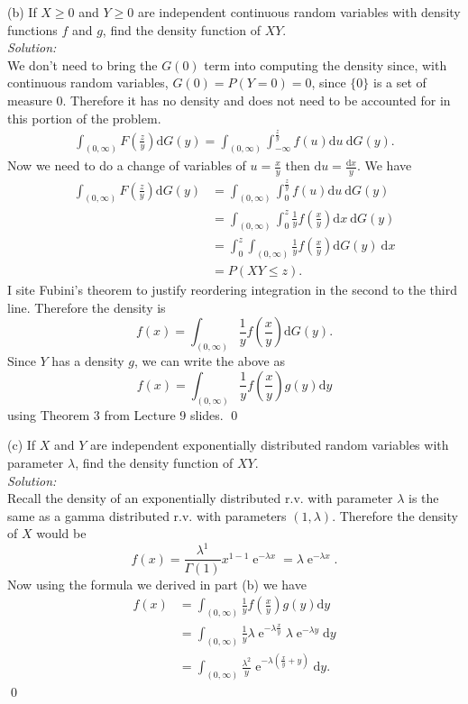\documentclass[10pt]{amsart}
\newcommand{\D}{\mathrm{d}}
\DeclareMathOperator{\E}{e}
\begin{document}
(b) If $X \geq 0$ and $Y \geq 0$ are independent continuous random variables with density functions $f$ and $g$, find the density function of $XY$. \\
\textit{Solution:} \\
We don't need to bring the $G(0)$ term into computing the density since, with continuous random variables, $G(0) = P(Y = 0) = 0$, since $\{0\}$ is a set of measure $0$.
Therefore it has no density and does not need to be accounted for in this portion of the problem.
\begin{align*}
\int_{(0, \infty)} F\left(\frac z y \right) \D G(y) = \int_{(0, \infty)} \int_{-\infty}^{\frac z y} f\left(u \right) \D u\: \D G(y).
\end{align*}
Now we need to do a change of variables of $u = \frac x y$ then $\D u = \frac{\D x}{y}$. We have
\begin{align*}
\int_{(0, \infty)} F\left(\frac z y \right) \D G(y)
	&= \int_{(0, \infty)} \int_{0}^{\frac z y} f\left(u \right) \D u\:  \D G(y) \\
	&= \int_{(0, \infty)} \int_{0}^z \frac {1}{y}f\left(\frac x y \right) \D x\:  \D G(y) \\
	&= \int_{0}^z \int_{(0, \infty)} \frac {1}{y}f\left(\frac x y \right) \D G(y)\: \D x \\
	&= P\left( XY \leq z \right).
\end{align*}
I site Fubini's theorem to justify reordering integration in the second to the third line.
Therefore the density is
$$
f(x) = \int_{(0, \infty)} \frac {1}{y}f\left(\frac x y \right) \D G(y).
$$
Since $Y$ has a density $g$, we can write the above as
$$
f(x) = \int_{(0, \infty)} \frac {1}{y}f\left(\frac x y \right)g(y)\D y
$$
using Theorem 3 from Lecture 9 slides.
\qed \\
\newpage

(c) If $X$ and $Y$ are independent exponentially distributed random variables with parameter $\lambda$, find the density function of $XY$.\\
\textit{Solution:} \\
Recall the density of an exponentially distributed r.v. with parameter $\lambda$ is the same as a gamma distributed r.v. with parameters $(1, \lambda)$.
Therefore the density of $X$ would be
$$
f(x) = \frac {\lambda^1} {\Gamma(1)} x^{1 - 1} \E^{-\lambda x} = \lambda \E^{-\lambda x}.
$$
Now using the formula we derived in part (b) we have
\begin{align*}
f(x) &= \int_{(0, \infty)} \frac {1}{y}f\left(\frac x y \right)g(y)\D y \\
	&= \int_{(0, \infty)} \frac {1}{y} \lambda \E^{-\lambda \frac x y} \lambda \E^{-\lambda y} \D y \\
	&= \int_{(0, \infty)} \frac {\lambda^2}{y} \E^{-\lambda \left( \frac x y + y \right)} \D y.
\end{align*}
\qed \\
\end{document}

